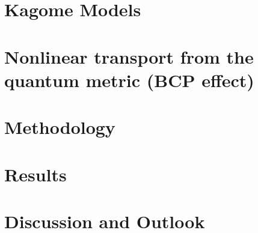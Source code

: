 \documentclass[reprint,aps,superscriptaddress]{revtex4-2}
\begin{document}
\section{Kagome Models}

\section{Nonlinear transport from the quantum metric (BCP effect)}


\section{Methodology}


\section{Results}

\section{Discussion and Outlook}



\end{document}
